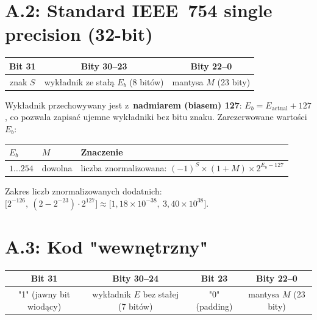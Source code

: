 \documentclass[12pt,a4paper]{article}
\begin{document}
\section*{A.2: Standard IEEE~754 single precision (32-bit)}

\begin{center}
\begin{tabular}{|c|c|c|}
\hline
\textbf{Bit 31} & \textbf{Bity 30--23} & \textbf{Bity 22--0} \\
\hline
znak $S$ & wykładnik ze stałą $E_b$ (8 bitów) & mantysa $M$ (23 bity) \\
\hline
\end{tabular}
\end{center}

Wykładnik przechowywany jest z~\textbf{nadmiarem (biasem) 127}:
$E_b = E_{\text{actual}} + 127$, co pozwala zapisać ujemne wykładniki
bez bitu znaku. Zarezerwowane wartości $E_b$:

\begin{center}
\begin{tabular}{lll}
\toprule
$E_b$ & $M$ & Znaczenie \\
\midrule
$1\ldots254$ & dowolna & liczba znormalizowana: $(-1)^S \times (1{+}M) \times 2^{E_b - 127}$ \\
\bottomrule
\end{tabular}
\end{center}

Zakres liczb znormalizowanych dodatnich:
$\bigl[2^{-126},\ (2 - 2^{-23}) \cdot 2^{127}\bigr]
\approx \bigl[1{,}18 \times 10^{-38},\ 3{,}40 \times 10^{38}\bigr]$.

\section*{A.3: Kod "wewnętrzny"}

\begin{center}
\begin{tabular}{|c|c|c|c|}
\hline
\textbf{Bit 31} & \textbf{Bity 30--24} & \textbf{Bit 23} & \textbf{Bity 22--0} \\
\hline
"1" (jawny bit wiodący) & wykładnik $E$ bez stałej (7 bitów) & "0" (padding) & mantysa $M$ (23 bity) \\
\hline
\end{tabular}
\end{center}
\end{document}
